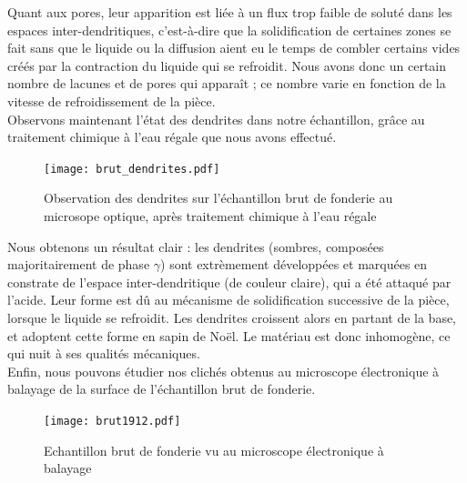 

Quant aux pores, leur apparition est liée à un flux trop faible de soluté 
dans les espaces inter-dendritiques, c'est-à-dire que la solidification de 
certaines zones se fait sans que le liquide ou la diffusion aient eu le 
temps de combler certains vides créés par la contraction du liquide qui
se refroidit. Nous avons donc un certain nombre de lacunes et de pores qui
apparaît ; ce nombre varie en fonction de la vitesse de refroidissement 
de la pièce.\\


Observons maintenant l'état des dendrites dans notre échantillon, grâce au 
traitement chimique à l'eau régale que nous avons effectué.\\ 


\begin{figure}[H]
    \centering
    \texttt{[image: brut\_dendrites.pdf]}
    \caption{Observation des dendrites sur l'échantillon brut de fonderie
     au microsope optique, après traitement chimique à l'eau régale}
    \label{fig:brut_dendrites_optique}
\end{figure}

Nous obtenons un résultat clair : les dendrites (sombres, composées majoritairement
de phase $\gamma$) sont extrèmement développées et marquées en constrate de 
l'espace inter-dendritique (de couleur claire), qui a été attaqué par l'acide. 
Leur forme est dû au mécanisme de solidification successive de la pièce, 
lorsque le liquide se refroidit. Les dendrites croissent alors en partant 
de la base, et adoptent cette forme en sapin de Noël. Le matériau est donc inhomogène, 
ce qui nuit à ses qualités mécaniques. \\


Enfin, nous pouvons étudier nos clichés obtenus au microscope électronique à balayage
de la surface de l'échantillon brut de fonderie. 

\begin{figure}[H]
    \centering
    \texttt{[image: brut1912.pdf]}
    \caption{Echantillon brut de fonderie vu au microscope électronique à balayage\\}
    \label{fig:brut_MEB}
\end{figure}

